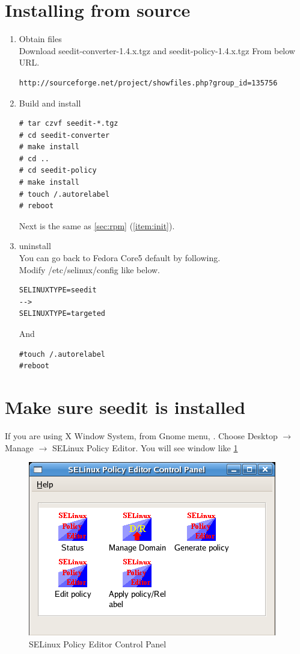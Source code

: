 \documentclass{article}
\begin{document}
\section{Installing from source}
\begin{enumerate}
 \item Obtain files\\
Download seedit-converter-1.4.x.tgz and seedit-policy-1.4.x.tgz
From below URL.
\begin{verbatim}
http://sourceforge.net/project/showfiles.php?group_id=135756	
\end{verbatim}
 \item Build and install\\
\begin{verbatim}
# tar czvf seedit-*.tgz
# cd seedit-converter
# make install
# cd .. 
# cd seedit-policy
# make install
# touch /.autorelabel
# reboot
\end{verbatim}
Next is the same as \ref{sec:rpm} (\ref{item:init}).\\
 \item uninstall\\
You can go back to Fedora Core5 default by following.\\
Modify /etc/selinux/config like below.
\begin{verbatim}
SELINUXTYPE=seedit
-->
SELINUXTYPE=targeted
\end{verbatim}
And 
\begin{verbatim}
#touch /.autorelabel
#reboot	
\end{verbatim}
\end{enumerate}

\section{Make sure seedit is installed}\label{sec:makesure}

If you are using X Window System,  from  Gnome menu, 
. Choose Desktop $\rightarrow$ Manage $\rightarrow$ SELinux
Policy Editor.
You will see window like \ref{fig:controlpanel}
\begin{figure}
\caption{SELinux Policy Editor Control Panel}\label{fig:controlpanel}
\includegraphics*{images/controlpanel.png}
\end{figure}
\end{document}

